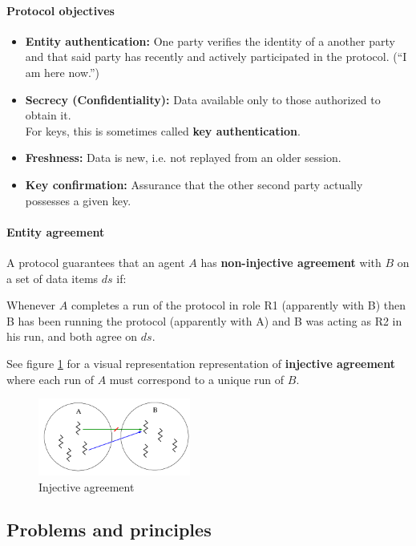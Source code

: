 \paragraph{Protocol objectives}
\begin{itemize}
    \item \textbf{Entity authentication:} One party verifies the identity of a another party and that said party has recently and actively participated in the protocol. (“I am here now.”)
    \item \textbf{Secrecy (Confidentiality):} Data available only to those authorized to obtain it.\\
        For keys, this is sometimes called \textbf{key authentication}.
    \item \textbf{Freshness:} Data is new, i.e. not replayed from an older session.
    \item \textbf{Key confirmation:} Assurance that the other second party actually possesses a given key.
\end{itemize}

\paragraph{Entity agreement}
A protocol guarantees that an agent $A$ has \textbf{non-injective agreement} with $B$ on a set of data items $ds$ if:

Whenever $A$ completes a run of the protocol in role R1 (apparently with B) then B has been running the protocol (apparently with A) and B was acting as R2 in his run, and both agree on $ds$.

See figure \ref{fig:injective-agreement} for a visual representation representation of \textbf{injective agreement} where each run of $A$ must correspond to a unique run of $B$.

\begin{figure}[b]
    \centering
    \includegraphics[width=5cm]{images/ch7-injective-agreement.png}
    \caption{Injective agreement}
    \label{fig:injective-agreement}
\end{figure}



\subsection{Problems and principles}

